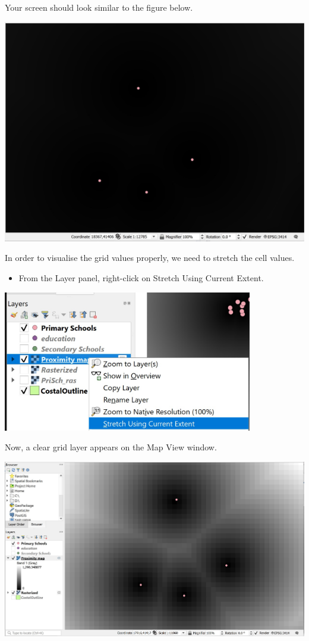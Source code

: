\documentclass[
  letterpaper,
  DIV=11,
  numbers=noendperiod]{scrreprt}
\providecommand{\tightlist}{%
  \setlength{\itemsep}{0pt}\setlength{\parskip}{0pt}}\usepackage{longtable,booktabs,array}
\begin{document}
Your screen should look similar to the figure below.

\includegraphics{./img06/image17.jpg}

In order to visualise the grid values properly, we need to stretch the
cell values.

\begin{itemize}
\tightlist
\item
  From the Layer panel, right-click on Stretch Using Current Extent.
\end{itemize}

\includegraphics[width=4.29167in,height=\textheight]{./img06/image18.jpg}

Now, a clear grid layer appears on the Map View window.

\includegraphics{./img06/image19.jpg}
\end{document}
